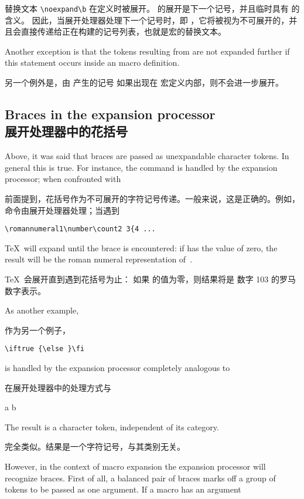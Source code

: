 替换文本 \verb>\noexpand\b> 在定义时被展开。
 的展开是下一个记号，并且临时具有  的含义。
因此，当展开处理器处理下一个记号时，即 ，它将被视为不可展开的，并且会直接传递给正在构建的记号列表，也就是宏的替换文本。

Another exception is that the tokens
resulting from 
are not expanded further if this statement occurs
inside an  macro definition.

另一个例外是，由  产生的记号
如果出现在  宏定义内部，则不会进一步展开。



\subsection{Braces in the expansion processor\\展开处理器中的花括号}

Above, it was said that braces are passed as unexpandable
character tokens. In general this is true. For instance,
the  command is handled by the expansion
processor; when confronted with 

前面提到，花括号作为不可展开的字符记号传递。一般来说，这是正确的。例如，
 命令由展开处理器处理；当遇到
\begin{verbatim}
\romannumeral1\number\count2 3{4 ...
\end{verbatim} 
\TeX\ will expand until the brace is encountered:
if  has the value of zero, the result will be
the roman numeral representation of~.

\TeX\ 会展开直到遇到花括号为止：
如果  的值为零，则结果将是
数字 103 的罗马数字表示。

As another example, 

作为另一个例子，\begin{verbatim}
\iftrue {\else }\fi
\end{verbatim}
is handled by the expansion processor 
completely analogous to

在展开处理器中的处理方式与\begin{disp} {\italic a} {\italic b}\end{disp}
\awp
The result is a character token, independent of its category.

完全类似。结果是一个字符记号，与其类别无关。
      

However, in the context of macro expansion 
the expansion  processor will 
recognize braces. 
First of all, a balanced pair of braces marks off a group of tokens
to be passed as one argument.
If a macro has an argument 

